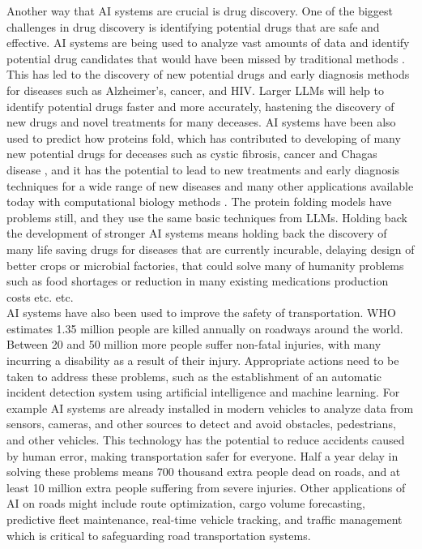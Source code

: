 \documentclass{article}
\begin{document}
Another way that AI systems are crucial is drug discovery. One of the biggest challenges in drug discovery is identifying potential drugs that are safe and effective. AI systems are being used to analyze vast amounts of data and identify potential drug candidates that would have been missed by traditional methods \cite{Cheng2018Network-based}. This has led to the discovery of new potential drugs and early diagnosis methods for diseases such as Alzheimer's\cite{fabrizio2021artificial}, cancer\cite{sebastian2022artificial}, and HIV\cite{xiang2022review,marcus2020artificial}. Larger LLMs will help to identify potential drugs faster and more accurately, hastening the discovery of new drugs and novel treatments for many deceases. AI systems have been also used to predict how proteins fold\cite{skolnick2021alphafold2}, which has contributed to developing of many new potential drugs for deceases such as cystic fibrosis\cite{vinhoven2022complementary}, cancer\cite{Ren2023AlphaFold, sarkar2023first} and Chagas disease \cite{ros-lucas2022alphafold}, and it has the potential to lead to new treatments and early diagnosis techniques for a wide range of new diseases and many other applications available today with computational biology methods \cite{Wong2022, zhang2022dpam}. The protein folding models have problems still, and they use the same basic techniques from LLMs. Holding back the development of stronger AI systems means holding back the discovery of many life saving drugs for diseases that are currently incurable, delaying design of better crops or microbial factories, that could solve many of humanity problems such as food shortages or reduction in many existing medications production costs etc. etc.\\

AI systems have also been used to improve the safety of transportation. WHO estimates 1.35 million people are killed annually on roadways around the world. Between 20 and 50 million more people suffer non-fatal injuries, with many incurring a disability as a result of their injury\cite{who2018road}. Appropriate actions need to be taken to address these problems, such as the establishment of an automatic incident detection system using artificial intelligence and machine learning\cite{das2022aihighwaysafety}. For example AI systems are already installed in modern vehicles to analyze data from sensors, cameras, and other sources to detect and avoid obstacles, pedestrians, and other vehicles\cite{olugbade2022review}. This technology has the potential to reduce accidents caused by human error, making transportation safer for everyone\cite{tselentis2023usefulness}. Half a year delay in solving these problems means 700 thousand extra people dead on roads, and at least 10 million extra people suffering from severe injuries. Other applications of AI on roads might include route optimization, cargo volume forecasting, predictive fleet maintenance, real-time vehicle tracking, and traffic management which is critical to safeguarding road transportation systems\cite{das2022aihighwaysafety}.\\
\end{document}
